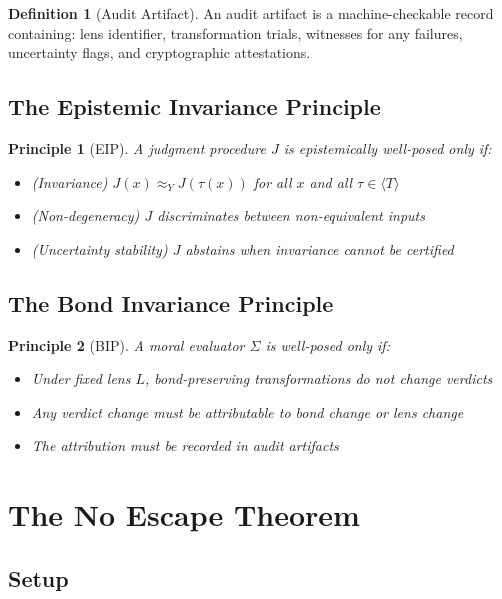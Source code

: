 \documentclass[12pt]{article}
\newtheorem{principle}{Principle}[section]
\theoremstyle{definition}
\newtheorem{definition}{Definition}[section]
\begin{document}
\begin{definition}[Audit Artifact]
An audit artifact is a machine-checkable record containing: lens identifier, transformation trials, witnesses for any failures, uncertainty flags, and cryptographic attestations.
\end{definition}

\subsection{The Epistemic Invariance Principle}

\begin{principle}[EIP]
A judgment procedure $J$ is epistemically well-posed only if:
\begin{itemize}
    \item \textup{(Invariance)} $J(x) \approx_Y J(\tau(x))$ for all $x$ and all $\tau \in \langle T \rangle$
    \item \textup{(Non-degeneracy)} $J$ discriminates between non-equivalent inputs
    \item \textup{(Uncertainty stability)} $J$ abstains when invariance cannot be certified
\end{itemize}
\end{principle}

\subsection{The Bond Invariance Principle}

\begin{principle}[BIP]
A moral evaluator $\Sigma$ is well-posed only if:
\begin{itemize}
    \item Under fixed lens $L$, bond-preserving transformations do not change verdicts
    \item Any verdict change must be attributable to bond change or lens change
    \item The attribution must be recorded in audit artifacts
\end{itemize}
\end{principle}

\section{The No Escape Theorem}

\subsection{Setup}
\end{document}
